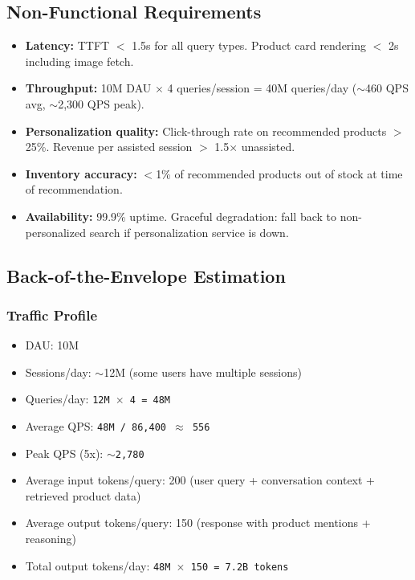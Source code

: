 \subsection*{Non-Functional Requirements}

\begin{itemize}
  \item \textbf{Latency:} TTFT $<$ 1.5s for all query types. Product card rendering $<$ 2s including image fetch.
  \item \textbf{Throughput:} 10M DAU $\times$ 4 queries/session = 40M queries/day ($\sim$460 QPS avg, $\sim$2,300 QPS peak).
  \item \textbf{Personalization quality:} Click-through rate on recommended products $>$ 25\%. Revenue per assisted session $>$ 1.5$\times$ unassisted.
  \item \textbf{Inventory accuracy:} $<$1\% of recommended products out of stock at time of recommendation.
  \item \textbf{Availability:} 99.9\% uptime. Graceful degradation: fall back to non-personalized search if personalization service is down.
\end{itemize}

\subsection*{Back-of-the-Envelope Estimation}

\subsubsection*{Traffic Profile}

\begin{itemize}
  \item DAU: 10M
  \item Sessions/day: $\sim$12M (some users have multiple sessions)
  \item Queries/day: \texttt{12M $\times$ 4 = 48M}
  \item Average QPS: \texttt{48M / 86,400 $\approx$ 556}
  \item Peak QPS (5x): \texttt{$\sim$2,780}
  \item Average input tokens/query: 200 (user query + conversation context + retrieved product data)
  \item Average output tokens/query: 150 (response with product mentions + reasoning)
  \item Total output tokens/day: \texttt{48M $\times$ 150 = 7.2B tokens}
\end{itemize}

